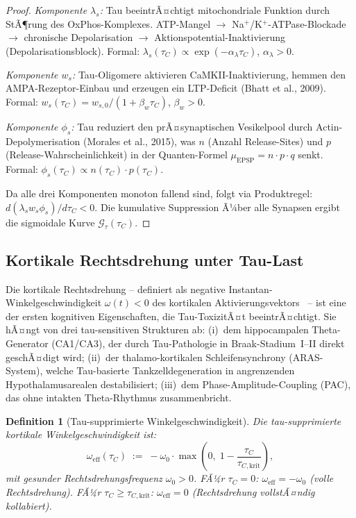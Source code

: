 ﻿\documentclass[12pt,a4paper]{article}
\newtheorem{definition}[theorem]{Definition}
\theoremstyle{definition}
\begin{document}
	\begin{proof}
		\emph{Komponente $\lambda_s$:} Tau beeintrÃ¤chtigt mitochondriale Funktion durch
		StÃ¶rung des OxPhos-Komplexes. ATP-Mangel $\to$ Na$^+$/K$^+$-ATPase-Blockade $\to$
		chronische Depolarisation $\to$ Aktionspotential-Inaktivierung (Depolarisationsblock).
		Formal: $\lambda_s(\tau_C) \propto \exp(-\alpha_\lambda \tau_C)$, $\alpha_\lambda > 0$.

		\emph{Komponente $w_s$:} Tau-Oligomere aktivieren CaMKII-Inaktivierung, hemmen den
		AMPA-Rezeptor-Einbau und erzeugen ein LTP-Deficit (Bhatt et al., 2009).
		Formal: $w_s(\tau_C) = w_{s,0}/(1 + \beta_w \tau_C)$, $\beta_w > 0$.

		\emph{Komponente $\phi_s$:} Tau reduziert den prÃ¤synaptischen Vesikelpool durch
		Actin-Depolymeri\-sation (Morales et al., 2015), was $n$ (Anzahl Release-Sites) und $p$
		(Release-Wahrscheinlich\-keit) in der Quanten-Formel $\mu_\mathrm{EPSP} = n \cdot p \cdot q$
		senkt. Formal: $\phi_s(\tau_C) \propto n(\tau_C) \cdot p(\tau_C)$.

		Da alle drei Komponenten monoton fallend sind, folgt via Produktregel:
		$d(\lambda_s w_s \phi_s)/d\tau_C < 0$.
		Die kumulative Suppression Ã¼ber alle Synapsen ergibt die sigmoidale Kurve
		$\mathcal{G}_\tau(\tau_C)$.
	\end{proof}

	\subsection{Kortikale Rechtsdrehung unter Tau-Last}

	Die kortikale Rechtsdrehung -- definiert als negative Instantan-Winkelgeschwindigkeit
	$\omega(t) < 0$ des kortikalen Aktivierungsvektors~\cite{Epp2026brn} -- ist eine der
	ersten kognitiven Eigenschaften, die Tau-ToxizitÃ¤t beeintrÃ¤chtigt. Sie hÃ¤ngt von drei
	tau-sensitiven Strukturen ab: (i)~dem hippocampalen Theta-Generator (CA1/CA3), der durch
	Tau-Pathologie in Braak-Stadium~I--II direkt geschÃ¤digt wird; (ii)~der thalamo-kortikalen
	Schleifensynchrony (ARAS-System), welche Tau-basierte Tankzelldegeneration in angrenzenden
	Hypothalamusarealen destabilisiert; (iii)~dem Phase-Amplitude-Coupling (PAC),
	das ohne intakten Theta-Rhythmus zusammenbricht.

	\begin{definition}[Tau-supprimierte Winkelgeschwindigkeit]
		\label{def:omega_tau}
		Die \emph{tau-supprimierte kortikale Winkelgeschwindigkeit} ist:
		\[
			\omega_{\mathrm{eff}}(\tau_C)
			\;:=\;
			-\omega_0 \cdot \max\!\left(0,\; 1 - \frac{\tau_C}{\tau_{C,\mathrm{krit}}}\right),
		\]
		mit gesunder Rechtsdrehungsfrequenz $\omega_0 > 0$. FÃ¼r $\tau_C = 0$:
		$\omega_{\mathrm{eff}} = -\omega_0$ (volle Rechtsdrehung). FÃ¼r
		$\tau_C \geq \tau_{C,\mathrm{krit}}$: $\omega_{\mathrm{eff}} = 0$
		(Rechtsdrehung vollstÃ¤ndig kollabiert).
	\end{definition}
\end{document}
